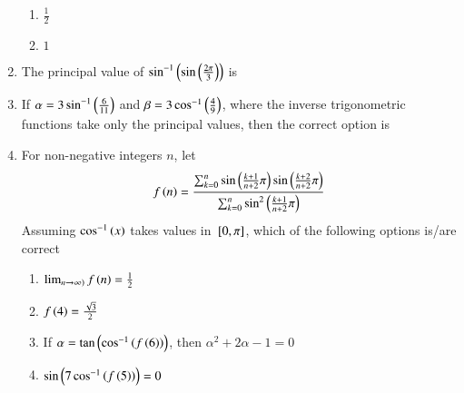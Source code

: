 \begin{enumerate}[label=\thesubsection.\arabic*,ref=\thesubsection.\theenumi]
{\begin{multicols}{2}
\begin{enumerate}
				\item{$\frac{1}{2}$}
				\item{$1$}
			\end{enumerate}
		\end{multicols}
		}
\item The principal value of $\sin ^{-1}\left(\sin \left(\frac{2\pi}{3}\right)\right)$ is
\hfill {}
\begin{enumerate}
\end{enumerate}
\item If $\alpha=3\sin ^{-1}\left(\frac{6}{11}\right)$ and $\beta=3\cos ^{-1}\left(\frac{4}{9}\right)$, where the inverse trigonometric functions take only the principal values, then the correct option is
\hfill {}
\begin{enumerate}
\end{enumerate}
\item For non-negative integers $n$, let 
\begin{align*}
f\left(n\right)= \frac{\sum_{k=0}^{n} \sin \left(\frac{k+1}{n+2}\pi\right)\sin \left(\frac{k+2}{n+2}\pi\right)}{\sum_{k=0}^{n} \sin ^2 \left(\frac{k+1}{n+2}\pi\right)}
\end{align*}
Assuming $\cos ^{-1}\left(x\right)$ takes values in ${}\left[0,\pi\right]$, which of the following options is/are correct
\hfill {}
\begin{enumerate}
\item $\lim_{n \rightarrow \infty)} f\left(n\right) = \frac{1}{2}$ 
\item $f\left(4\right)=\frac{\sqrt{3}}{2}$
\item If $\alpha = \tan \left(\cos ^{-1}\left(f\left(6\right)\right)\right)$, then $\alpha ^2 + 2\alpha -1 =0$
\item $\sin \left(7\cos ^{-1}\left(f\left(5\right)\right)\right)=0$
\end{enumerate}

\end{enumerate}
